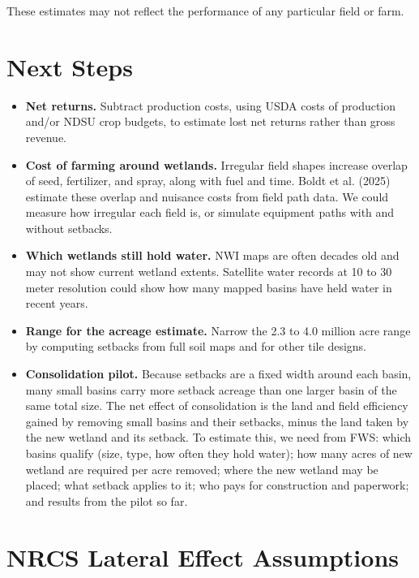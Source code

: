 \documentclass{theme/arpc-memo}
\begin{document}
These estimates may not reflect the performance of any particular field or farm.

\section{Next Steps}

\begin{itemize}
\item \textbf{Net returns.} Subtract production costs, using USDA costs of production and/or NDSU crop budgets, to estimate lost net returns rather than gross revenue.
\item \textbf{Cost of farming around wetlands.} Irregular field shapes increase overlap of seed, fertilizer, and spray, along with fuel and time. Boldt et al. (2025) estimate these overlap and nuisance costs from field path data. We could measure how irregular each field is, or simulate equipment paths with and without setbacks.
\item \textbf{Which wetlands still hold water.} NWI maps are often decades old and may not show current wetland extents. Satellite water records at 10 to 30 meter resolution could show how many mapped basins have held water in recent years.
\item \textbf{Range for the acreage estimate.} Narrow the 2.3 to 4.0 million acre range by computing setbacks from full soil maps and for other tile designs.
\item \textbf{Consolidation pilot.} Because setbacks are a fixed width around each basin, many small basins carry more setback acreage than one larger basin of the same total size. The net effect of consolidation is the land and field efficiency gained by removing small basins and their setbacks, minus the land taken by the new wetland and its setback. To estimate this, we need from FWS: which basins qualify (size, type, how often they hold water); how many acres of new wetland are required per acre removed; where the new wetland may be placed; what setback applies to it; who pays for construction and paperwork; and results from the pilot so far.
\end{itemize}


\clearpage
\appendix
\section{NRCS Lateral Effect Assumptions}\label{app:nrcs}
\end{document}
